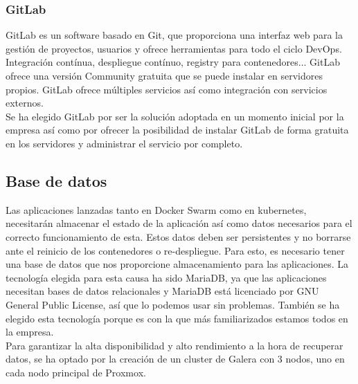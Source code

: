 		\subsubsection{GitLab}
			\begin{paragraph}
				GitLab es un software basado en Git, que proporciona una interfaz web para la gestión de proyectos, usuarios y ofrece herramientas para todo el ciclo DevOps. Integración contínua, despliegue contínuo, registry para contenedores... GitLab ofrece una versión Community gratuita que se puede instalar en servidores propios. GitLab ofrece múltiples servicios así como integración con servicios externos. \\
				Se ha elegido GitLab por ser la solución adoptada en un momento inicial por la empresa así como por ofrecer la posibilidad de instalar GitLab de forma gratuita en los servidores y administrar el servicio por completo. 
			\end{paragraph}
		
		\subsection{Base de datos}
		\begin{paragraph}
			Las aplicaciones lanzadas tanto en Docker Swarm como en kubernetes, necesitarán almacenar el estado de la aplicación así como datos necesarios para el correcto funcionamiento de esta. Estos datos deben ser persistentes y no borrarse ante el reinicio de los contenedores o re-despliegue. Para esto, es necesario tener una base de datos que nos proporcione almacenamiento para las aplicaciones. La tecnología elegida para esta causa ha sido MariaDB, ya que las aplicaciones necesitan bases de datos relacionales y MariaDB está licenciado por GNU General Public License, así que lo podemos usar sin problemas. También se ha elegido esta tecnología porque es con la que más familiarizados estamos todos en la empresa. \\
			Para garantizar la alta disponibilidad y alto rendimiento a la hora de recuperar datos, se ha optado por la creación de un cluster de Galera \cite{galeracluster:online} con 3 nodos, uno en cada nodo principal de Proxmox.
		\end{paragraph}
